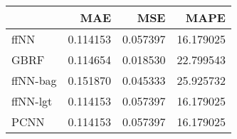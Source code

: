 \begin{tabular}{lrrr}
\toprule
{} &       MAE &       MSE &       MAPE \\
\midrule
ffNN     &  0.114153 &  0.057397 &  16.179025 \\
GBRF     &  0.114654 &  0.018530 &  22.799543 \\
ffNN-bag &  0.151870 &  0.045333 &  25.925732 \\
ffNN-lgt &  0.114153 &  0.057397 &  16.179025 \\
PCNN     &  0.114153 &  0.057397 &  16.179025 \\
\bottomrule
\end{tabular}
